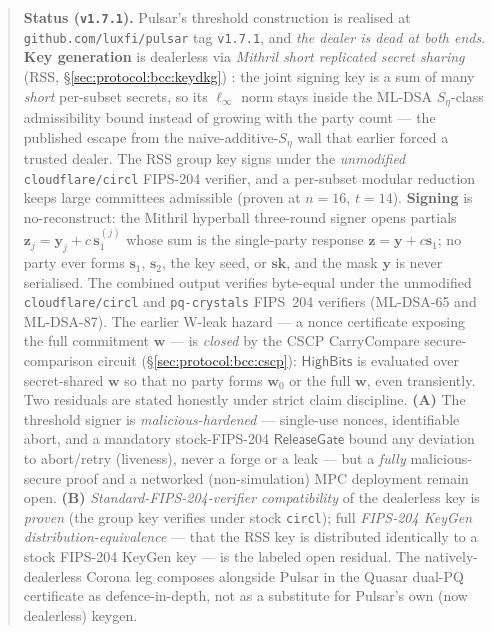 \documentclass[11pt,a4paper]{article}
\begin{document}
\begin{abstract}
\textbf{Status (\texttt{v1.7.1}).} Pulsar's threshold construction is realised at \texttt{github.com/luxfi/pulsar} tag \texttt{v1.7.1}, and \emph{the dealer is dead at both ends}. \textbf{Key generation} is dealerless via \emph{Mithril short replicated secret sharing} (RSS, \S\ref{sec:protocol:bcc:keydkg}) \cite{mithril2026}: the joint signing key is a sum of many \emph{short} per-subset secrets, so its $\ell_\infty$ norm stays inside the ML-DSA $S_\eta$-class admissibility bound instead of growing with the party count --- the published escape \cite{mithril2026} from the naive-additive-$S_\eta$ wall that earlier forced a trusted dealer. The RSS group key signs under the \emph{unmodified} \texttt{cloudflare/circl} FIPS-204 verifier, and a per-subset modular reduction keeps large committees admissible (proven at $n{=}16$, $t{=}14$). \textbf{Signing} is no-reconstruct: the Mithril hyperball three-round signer opens partials $\mathbf{z}_j = \mathbf{y}_j + c\,\mathbf{s}_1^{(j)}$ whose sum is the single-party response $\mathbf{z} = \mathbf{y} + c\mathbf{s}_1$; no party ever forms $\mathbf{s}_1$, $\mathbf{s}_2$, the key seed, or $\mathbf{sk}$, and the mask $\mathbf{y}$ is never serialised. The combined output verifies byte-equal under the unmodified \texttt{cloudflare/circl} and \texttt{pq-crystals} FIPS~204 verifiers (ML-DSA-65 and ML-DSA-87). The earlier W-leak hazard --- a nonce certificate exposing the full commitment $\mathbf{w}$ --- is \emph{closed} by the CSCP CarryCompare secure-comparison circuit (\S\ref{sec:protocol:bcc:cscp}): $\mathsf{HighBits}$ is evaluated over secret-shared $\mathbf{w}$ so that no party forms $\mathbf{w}_0$ or the full $\mathbf{w}$, even transiently. Two residuals are stated honestly under strict claim discipline. \textbf{(A)} The threshold signer is \emph{malicious-hardened} --- single-use nonces, identifiable abort, and a mandatory stock-FIPS-204 $\mathsf{ReleaseGate}$ bound any deviation to abort/retry (liveness), never a forge or a leak --- but a \emph{fully} malicious-secure proof and a networked (non-simulation) MPC deployment remain open. \textbf{(B)} \emph{Standard-FIPS-204-verifier compatibility} of the dealerless key is \emph{proven} (the group key verifies under stock \texttt{circl}); full \emph{FIPS-204 KeyGen distribution-equivalence} --- that the RSS key is distributed identically to a stock FIPS-204 \textsf{KeyGen} key --- is the labeled open residual. The natively-dealerless Corona leg \cite{corona} composes alongside Pulsar in the Quasar dual-PQ certificate as defence-in-depth, not as a substitute for Pulsar's own (now dealerless) keygen.


\end{abstract}
\end{document}

